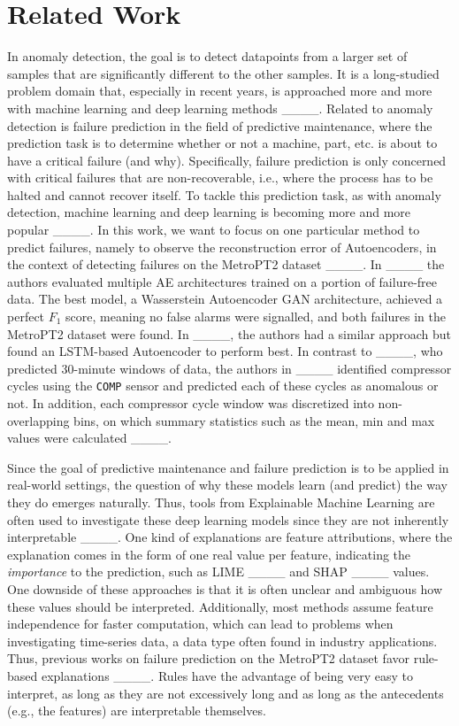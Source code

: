 \section{Related Work}
\label{sec:related}
In anomaly detection, the goal is to detect datapoints from a larger set of samples that are significantly different to the other samples.
It is a long-studied problem domain that, especially in recent years, is approached more and more with machine learning and deep learning methods ____.
Related to anomaly detection is failure prediction in the field of predictive maintenance, where the prediction task is to determine whether or not a machine, part, etc. is about to have a critical failure (and why).
Specifically, failure prediction is only concerned with critical failures that are non-recoverable, i.e., where the process has to be halted and cannot recover itself.
To tackle this prediction task, as with anomaly detection, machine learning and deep learning is becoming more and more popular ____.
In this work, we want to focus on one particular method to predict failures, namely to observe the reconstruction error of Autoencoders, in the context of detecting failures on the MetroPT2 dataset ____.
In ____ the authors evaluated multiple AE architectures trained on a portion of failure-free data.
The best model, a Wasserstein Autoencoder GAN architecture, achieved a perfect $F_1$ score, meaning no false alarms were signalled, and both failures in the MetroPT2 dataset were found.
In ____, the authors had a similar approach but found an LSTM-based Autoencoder to perform best.
In contrast to ____, who predicted 30-minute windows of data, the authors in ____ identified compressor cycles using the \texttt{COMP} sensor and predicted each of these cycles as anomalous or not.
In addition, each compressor cycle window was discretized into non-overlapping bins, on which summary statistics such as the mean, min and max values were calculated ____.

Since the goal of predictive maintenance and failure prediction is to be applied in real-world settings, the question of why these models learn (and predict) the way they do emerges naturally.
Thus, tools from Explainable Machine Learning are often used to investigate these deep learning models since they are not inherently interpretable ____.
One kind of explanations are feature attributions, where the explanation comes in the form of one real value per feature, indicating the \textit{importance} to the prediction, such as LIME ____ and SHAP ____ values.
One downside of these approaches is that it is often unclear and ambiguous how these values should be interpreted.
Additionally, most methods assume feature independence for faster computation, which can lead to problems when investigating time-series data, a data type often found in industry applications.
Thus, previous works on failure prediction on the MetroPT2 dataset favor rule-based explanations ____.
Rules have the advantage of being very easy to interpret, as long as they are not excessively long and as long as the antecedents (e.g., the features) are interpretable themselves.

